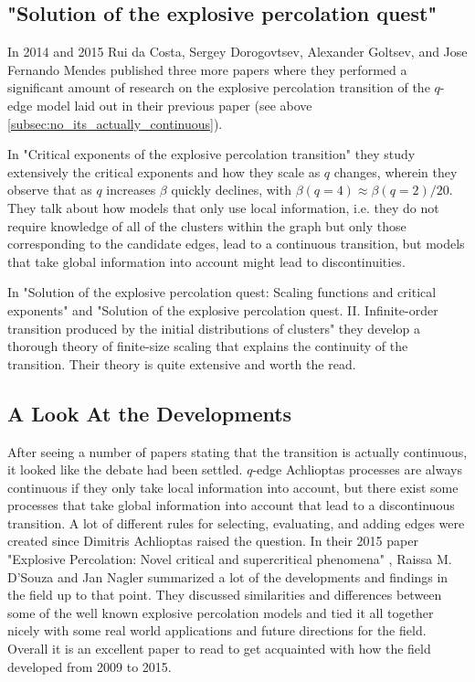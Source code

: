 \subsection{"Solution of the explosive percolation quest"}
In 2014 and 2015 Rui da Costa, Sergey Dorogovtsev, Alexander Goltsev, and Jose Fernando Mendes published three more papers \cite{da_Costa_5, da_Costa_2, da_Costa_3} where they performed a significant amount of research on the explosive percolation transition of the $q$-edge model laid out in their previous paper (see above \ref{subsec:no_its_actually_continuous}).

In "Critical exponents of the explosive percolation transition" \cite{da_Costa_5} they study extensively the critical exponents and how they scale as $q$ changes, wherein they observe that as $q$ increases $\beta$ quickly declines, with $\beta(q = 4) \approx \beta(q = 2) / 20$.
They talk about how models that only use local information, i.e. they do not require knowledge of all of the clusters within the graph but only those corresponding to the candidate edges, lead to a continuous transition, but models that take global information into account might lead to discontinuities.

In "Solution of the explosive percolation quest: Scaling functions and critical exponents" \cite{da_Costa_2}
and "Solution of the explosive percolation quest. II. Infinite-order transition produced by the initial distributions of clusters" \cite{da_Costa_3} they develop a thorough theory of finite-size scaling that explains the continuity of the transition.
Their theory is quite extensive and worth the read.



\subsection{A Look At the Developments}
After seeing a number of papers stating that the transition is actually continuous, it looked like the debate had been settled.
$q$-edge Achlioptas processes are always continuous if they only take local information into account, but there exist some processes that take global information into account that lead to a discontinuous transition.
A lot of different rules for selecting, evaluating, and adding edges were created since Dimitris Achlioptas raised the question.
In their 2015 paper "Explosive Percolation: Novel critical and supercritical phenomena" \cite{D_Souza_2}, Raissa M. D’Souza and Jan Nagler summarized a lot of the developments and findings in the field up to that point.
They discussed similarities and differences between some of the well known explosive percolation models and tied it all together nicely with some real world applications and future directions for the field.
Overall it is an excellent paper to read to get acquainted with how the field developed from 2009 to 2015.
